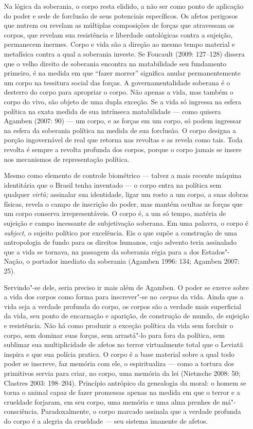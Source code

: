 Na lógica da soberania, o corpo resta elidido, a não ser como ponto de
aplicação do poder e sede de forclusão de seus potenciais específicos.
Os afetos perigosos que nutrem ou revelam as múltiplas composições de
forças que atravessam os corpos, que revelam sua resistência e liberdade
ontológicas contra a sujeição, permanecem inermes. Corpo e vida são a
direção ao mesmo tempo material e metafísica contra a qual a soberania
investe. Se Foucault (2009: 127--128) dissera que o velho direito de
soberania encontra na matabilidade seu fundamento primeiro, é na medida
em que ``fazer morrer'' significa anular permanentemente um corpo na
tessitura social das forças. A governamentalidade soberana é o desterro
do corpo para apropriar o corpo. Não apenas a vida, mas também o corpo
do vivo, são objeto de uma dupla exceção. Se a vida só ingressa na
esfera política na exata medida de sua intrínseca matabilidade --- como
quisera Agamben (2007: 90) --- um corpo, e as forças em um corpo, só
podem ingressar na esfera da soberania política na medida de sua
forclusão. O corpo designa a porção ingovernável de real que retorna nas
revoltas e as revela como tais. Toda revolta é sempre a revolta profunda
dos corpos, porque o corpo jamais se insere nos mecanismos de
representação política.

Mesmo como elemento de controle biométrico --- talvez a mais recente
máquina identitária que o Brasil tenha inventado --- o corpo entra na
política sem qualquer \emph{virtù; }assinalar sua identidade, ligar um
rosto a um corpo, a suas dobras físicas, revela o campo de inscrição do
poder, mas mantém ocultas as forças que um corpo conserva
irrepresentáveis. O corpo é, a um só tempo, matéria de sujeição e campo
incessante de subjetivação soberana. Em uma palavra, o corpo é
\emph{subject,} o sujeito político por excelência. Eis o que supõe a
construção de uma antropologia de fundo para os direitos humanos, cujo
advento teria assinalado que a vida se tornava, na passagem da soberania
régia para a dos Estados"-Nação, o portador imediato da soberania
(Agamben 1996: 134; Agamben 2007: 25).

Servindo"-se dele, seria preciso ir mais além de Agamben. O poder se
exerce sobre a vida dos corpos como forma para inscrever"-se no
\emph{corpus }da vida. Ainda que a vida seja a verdade profunda do
corpo, os corpos são a verdade mais superficial da vida, seu ponto de
encarnação e aparição, de construção de mundo, de sujeição e
resistência. Não há como produzir a exceção política da vida sem
forcluir o corpo, sem dominar suas forças, sem arrastá"-lo para fora da
política, sem sublimar sua multiplicidade de afetos no terror
virtualmente total que o Leviatã inspira e que sua polícia pratica. O
corpo é a base material sobre a qual todo poder se inscreve, faz memória
com ele, o espiritualiza --- como a tortura dos primitivos servia para
criar, no corpo, uma memória da lei (Nietzsche 2008: 50; Clastres 2003:
198--204). Princípio antrópico da genealogia da moral: o homem se torna
o animal capaz de fazer promessas apenas na medida em que o terror e a
crueldade forjaram, em seu corpo, uma memória e uma alma prenhes de
má"-consciência. Paradoxalmente, o corpo marcado assinala que a verdade
profunda do corpo é a alegria da crueldade --- seu sistema imanente de
afetos.

